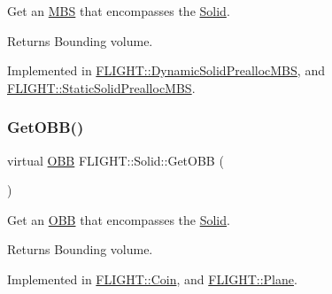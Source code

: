 Get an \hyperlink{class_f_l_i_g_h_t_1_1_m_b_s}{M\+BS} that encompasses the \hyperlink{class_f_l_i_g_h_t_1_1_solid}{Solid}. 

\begin{DoxyReturn}{Returns}
Bounding volume. 
\end{DoxyReturn}


Implemented in \hyperlink{class_f_l_i_g_h_t_1_1_dynamic_solid_prealloc_m_b_s_ab509519b0315831b085e5478ce6ea50f}{F\+L\+I\+G\+H\+T\+::\+Dynamic\+Solid\+Prealloc\+M\+BS}, and \hyperlink{class_f_l_i_g_h_t_1_1_static_solid_prealloc_m_b_s_a3598b87e0be4695f62f526d74e99dc33}{F\+L\+I\+G\+H\+T\+::\+Static\+Solid\+Prealloc\+M\+BS}.

\mbox{\label{class_f_l_i_g_h_t_1_1_solid_a8234bad63b8aff2f613407d80eee4bef}} 
\subsubsection{\texorpdfstring{Get\+O\+B\+B()}{GetOBB()}}
{\footnotesize\ttfamily virtual \hyperlink{class_f_l_i_g_h_t_1_1_o_b_b}{O\+BB} F\+L\+I\+G\+H\+T\+::\+Solid\+::\+Get\+O\+BB (\begin{DoxyParamCaption}{ }\end{DoxyParamCaption})\hspace{0.3cm}{\ttfamily [pure virtual]}}



Get an \hyperlink{class_f_l_i_g_h_t_1_1_o_b_b}{O\+BB} that encompasses the \hyperlink{class_f_l_i_g_h_t_1_1_solid}{Solid}. 

\begin{DoxyReturn}{Returns}
Bounding volume. 
\end{DoxyReturn}


Implemented in \hyperlink{class_f_l_i_g_h_t_1_1_coin_a7f4bf6128f703b6501a2596e8a562eea}{F\+L\+I\+G\+H\+T\+::\+Coin}, and \hyperlink{class_f_l_i_g_h_t_1_1_plane_aaef56e8e418918a941ae740bbc818518}{F\+L\+I\+G\+H\+T\+::\+Plane}.

\mbox{\label{class_f_l_i_g_h_t_1_1_solid_afcaa25bff89717d44a822723682a63f8}} 
